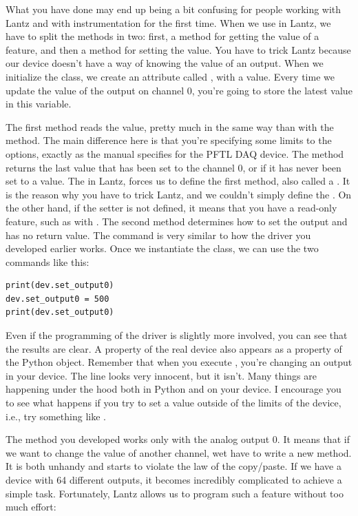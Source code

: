 What you have done may end up being a bit confusing for people working with Lantz and with instrumentation for the first time. When we use  in Lantz, we have to split the methods in two: first, a method for getting the value of a feature, and then a method for setting the value. You have to trick Lantz because our device doesn't have a way of knowing the value of an output. When we initialize the class, we create an attribute called , with a  value. Every time we update the value of the output on channel 0, you're going to store the latest value in this variable.

The first method reads the value, pretty much in the same way than with the  method. The main difference here is that you're specifying some limits to the options, exactly as the manual specifies for the {PFTL DAQ} device. The method  returns the last value that has been set to the channel 0, or  if it has never been set to a value. The  in Lantz, forces us to define the first method, also called a . It is the reason why you have to trick Lantz, and we couldn't simply define the . On the other hand, if the setter is not defined, it means that you have a read-only feature, such as with . The second method determines how to set the output and has no return value. The command is very similar to how the driver you developed earlier works. Once we instantiate the class, we can use the two commands like this:

\begin{verbatim}
print(dev.set_output0)
dev.set_output0 = 500
print(dev.set_output0)
\end{verbatim}

Even if the programming of the driver is slightly more involved, you can see that the results are clear. A property of the real device also appears as a property of the Python object. Remember that when you execute , you're changing an output in your device. The line looks very innocent, but it isn't. Many things are happening under the hood both in Python and on your device. I encourage you to see what happens if you try to set a value outside of the limits of the device, i.e., try something like .

The method you developed works only with the analog output 0. It means that if we want to change the value of another channel, wet have to write a new method. It is both unhandy and starts to violate the law of the copy/paste. If we have a device with 64 different outputs, it becomes incredibly complicated to achieve a simple task. Fortunately, Lantz allows us to program such a feature without too much effort:

